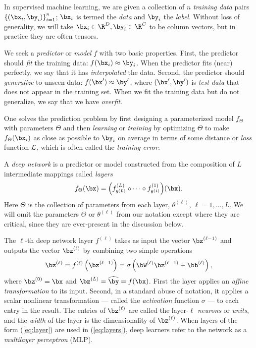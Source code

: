 \documentclass{notices}
\begin{document}
In supervised machine learning, we are given a collection of $n$ {\em training data} pairs $\left\{ (\bx_i, \by_i) \right\}_{i=1}^n$;
$\bx_i$ is termed the {\em data} and $\by_i$ the {\em label}.
Without loss of generality, we will take $\bx_i\in\R^D,\by_i\in\R^C$ to be column vectors, but in practice they are often tensors.


We seek a {\em predictor} or {\em model} $f$ with two basic properties.
First, the predictor should {\em fit} the training data: $f(\bx_i)\approx \by_i$.
When the predictor fits (near) perfectly, we say that it has {\em interpolated} the data.
Second, the predictor should {\em generalize} to unseen data: $f(\bx')\approx \by'$, where $(\bx', \by')$ is {\em test data} that does not appear in the training set.
When we fit the training data but do not generalize, we say that we have {\em overfit}.

One solves the prediction problem by first designing a parameterized model $f_\Theta$ with parameters $\Theta$ and then {\em learning} or {\em training} by optimizing $\Theta$ to make $f_\Theta(\bx_i)$ as close as possible to $\by_i$ on average in terms of some distance or {\em loss} function ${\cal L}$, which is often called the {\em training error}.


A {\em deep network} is a predictor or model constructed from the composition of $L$ intermediate mappings called {\em layers} \cite{goodfellow2016deep}
\begin{equation}
f_\Theta(\bx)= \left(f^{(L)}_{\theta^{(L)}} \circ \dots \circ f^{(1)}_{\theta^{(1)}}\right)\!(\bx).
\label{eq:layers}
\end{equation}
Here $\Theta$
is the collection of parameters from each layer, $\theta^{(\ell)}$, $\ell=1,\dots,L$.
We will omit the parameters $\Theta$ or $\theta^{(\ell)}$ from our notation except where they are critical, since they are ever-present in the discussion below.


The $\ell$-th deep network layer $f^{(\ell)}$ takes as input the vector $\bz^{(\ell-1)}$ and outputs the vector $\bz^{(\ell)}$ by combining two simple operations
\begin{equation}
\bz^{(\ell)} 
= f^{(\ell)}\left(\bz^{(\ell-1)}\right)
= \sigma \left(\bW^{(\ell)} \bz^{(\ell-1)} + \bb^{(\ell)} \right),
\label{eq:layer}
\end{equation}
where $\bz^{(0)}=\bx$ and $\bz^{(L)} = \widehat{\by} = f(\bx)$. 
First the layer applies an {\em affine transformation} to its input.
Second, in a standard abuse of notation, it applies a scalar nonlinear transformation --- called the {\em activation} function $\sigma$ --- to each entry in the result.
The entries of $\bz^{(\ell)}$ are called the layer-$\ell$ {\em neurons} or {\em units},
and the {\em width} of the layer is the dimensionality of $\bz^{(\ell)}$.
When layers of the form (\ref{eq:layer}) are used in (\ref{eq:layers}), deep learners refer to the network as a {\em multilayer perceptron} (MLP).
\end{document}
